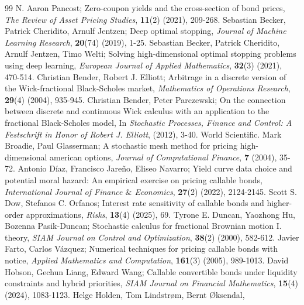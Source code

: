 \documentclass[10pt,a4paper]{amsart}
\numberwithin{equation}{section}
\begin{document}
\begin{thebibliography}{99}
 N. Aaron Pancost;
Zero-coupon yields and the cross-section of bond prices,
\emph{The Review of Asset Pricing Studies}, \textbf{11}(2) (2021), 209-268.
 Sebastian Becker, Patrick Cheridito, Arnulf Jentzen;
Deep optimal stopping,
\emph{Journal of Machine Learning Research}, \textbf{20}(74) (2019), 1-25.
 Sebastian Becker, Patrick Cheridito, Arnulf Jentzen, Timo Welti;
Solving high-dimensional optimal stopping problems using deep learning,
\emph{European Journal of Applied Mathematics}, \textbf{32}(3) (2021), 470-514.
 Christian Bender, Robert J. Elliott;
Arbitrage in a discrete version of the Wick-fractional Black-Scholes market,
\emph{Mathematics of Operations Research}, \textbf{29}(4) (2004), 935-945.
 Christian Bender, Peter Parczewski;
On the connection between discrete and continuous Wick calculus with an application to the fractional Black-Scholes model,
In \emph{Stochastic Processes, Finance and Control: A Festschrift in Honor of Robert J. Elliott}, (2012), 3-40. World Scientific.
 Mark Broadie, Paul Glasserman;
A stochastic mesh method for pricing high-dimensional american options,
\emph{Journal of Computational Finance}, \textbf{7} (2004), 35-72.
 Antonio D\'{i}az, Francisco Jare\~{n}o, Eliseo Navarro;
Yield curve data choice and potential moral hazard: An empirical exercise on pricing callable bonds,
\emph{International Journal of Finance $\&$ Economics}, \textbf{27}(2) (2022), 2124-2145.
 Scott S. Dow, Stefanos C. Orfanos;
Interest rate sensitivity of callable bonds and higher-order approximations,
\emph{Risks}, \textbf{13}(4) (2025), 69.
 Tyrone E. Duncan, Yaozhong Hu, Bozenna Pasik-Duncan;
Stochastic calculus for fractional Brownian motion I. theory,
\emph{SIAM Journal on Control and Optimization}, \textbf{38}(2) (2000), 582-612.
 Javier Farto, Carlos V\'{a}zquez;
Numerical techniques for pricing callable bonds with notice,
\emph{Applied Mathematics and Computation}, \textbf{161}(3) (2005), 989-1013.
 David Hobson, Gechun Liang, Edward Wang;
Callable convertible bonds under liquidity constraints and hybrid priorities,
\emph{SIAM Journal on Financial Mathematics}, \textbf{15}(4) (2024), 1083-1123.
 Helge Holden, Tom Lindstr{\o}m, Bernt {\O}ksendal, 

\end{thebibliography}
\end{document}

